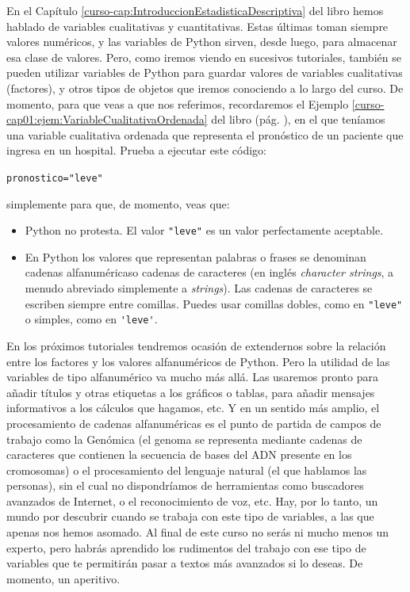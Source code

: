 \documentclass[10pt,a4paper]{article}\usepackage[]{graphicx}\usepackage[]{color}
\makeatletter
\newcommand{\hlstr}[1]{\textcolor[rgb]{0.192,0.494,0.8}{#1}}%
\newcommand{\hlstd}[1]{\textcolor[rgb]{0.345,0.345,0.345}{#1}}%
\newcommand{\hlkwb}[1]{\textcolor[rgb]{0.69,0.353,0.396}{#1}}%
\newenvironment{kframe}{%
 \def\at@end@of@kframe{}%
 \ifinner\ifhmode%
  \def\at@end@of@kframe{\end{minipage}}%
  \begin{minipage}{\columnwidth}%
 \fi\fi%
 \def\FrameCommand##1{\hskip\@totalleftmargin \hskip-\fboxsep
 \colorbox{shadecolor}{##1}\hskip-\fboxsep
     \hskip-\linewidth \hskip-\@totalleftmargin \hskip\columnwidth}%
 \MakeFramed {\advance\hsize-\width
   \@totalleftmargin\z@ \linewidth\hsize
   \@setminipage}}%
 {\par\unskip\endMakeFramed%
 \at@end@of@kframe}
\newenvironment{knitrout}{}{} %
\newcounter {cont01}
\makeatother
\begin{document}
En el Capítulo \ref{curso-cap:IntroduccionEstadisticaDescriptiva} del libro hemos hablado de variables cualitativas y cuantitativas. Estas últimas toman siempre valores numéricos, y las variables de Python sirven, desde luego, para almacenar esa clase de valores. Pero, como iremos viendo en sucesivos tutoriales, también se pueden utilizar variables de Python para guardar valores de variables cualitativas (factores), y otros tipos de objetos que iremos conociendo a lo largo del curso. De momento, para que veas a que nos referimos, recordaremos el Ejemplo \ref{curso-cap01:ejem:VariableCualitativaOrdenada} del libro (pág. \pageref{curso-cap01:ejem:VariableCualitativaOrdenada}), en el que teníamos una variable cualitativa ordenada que representa el pronóstico de un paciente que ingresa en un hospital. Prueba a ejecutar este código:
\begin{knitrout}
\color{fgcolor}\begin{kframe}
\begin{alltt}
\hlstd{pronostico} \hlkwb{=} \hlstr{"leve"}
\end{alltt}
\end{kframe}
\end{knitrout}
simplemente para que, de momento, veas que:
\begin{itemize}
  \item Python no protesta. El valor \verb#"leve"# es un valor perfectamente aceptable.
  \item En Python los valores que representan palabras o frases se denominan {\sf cadenas alfanuméricas}o {\sf cadenas de caracteres} (en inglés {\em character strings}, a menudo abreviado simplemente a {\em strings}). Las cadenas de caracteres se escriben siempre entre comillas. Puedes usar comillas dobles, como en \verb#"leve"# o simples, como en  \verb#'leve'#.
\end{itemize}
En los próximos tutoriales tendremos ocasión de extendernos sobre la relación entre los factores y los valores alfanuméricos de Python. Pero la utilidad de las variables de tipo alfanumérico va mucho más allá. Las usaremos pronto para añadir títulos y otras etiquetas a los gráficos o tablas, para añadir mensajes informativos a los cálculos que hagamos, etc. Y en un sentido más amplio, el procesamiento de cadenas alfanuméricas es el punto de partida de campos de trabajo como la Genómica (el genoma se representa mediante cadenas de caracteres que contienen la secuencia de bases del ADN presente en los cromosomas) o el procesamiento del lenguaje natural (el que hablamos las personas), sin el cual no dispondríamos de herramientas como buscadores avanzados de Internet, o el reconocimiento de voz, etc. Hay, por lo tanto, un mundo por descubrir cuando se trabaja con este tipo de variables, a las que apenas nos hemos asomado. Al final de este curso no serás ni mucho menos un experto, pero habrás aprendido los rudimentos del trabajo con ese tipo de variables que te permitirán pasar a textos más avanzados si lo deseas. De momento, un aperitivo.
\end{document}
